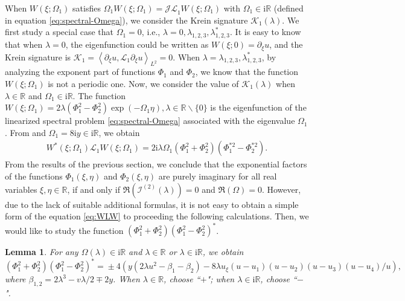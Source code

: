 \documentclass[11pt,reqno]{amsart}
\newcommand{\ii}{\mathrm{i}}
\newtheorem{lemma}{Lemma}
\numberwithin{equation}{section}
\begin{document}
When $W(\xi;\Omega_1)$ satisfies $\Omega_1W(\xi;\Omega_1)=\mathcal{JL}_1W(\xi;\Omega_1)$ with $\Omega_1\in \ii\mathbb{R}$ (defined in equation \eqref{eq:spectral-Omega}), we consider the Krein signature $\mathcal{K}_1(\lambda)$. 
We first study a special case that $\Omega_1=0$, i.e., $\lambda=0,\lambda_{1,2,3},\lambda_{1,2,3}^*$. 
It is easy to know that when $\lambda=0$, the eigenfunction could be written as $W(\xi;0)=\partial_{\xi}u$, and the Krein signature is $\mathcal{K}_1=\left\langle\partial_{\xi}u,\mathcal{L}_1 \partial_{\xi}u \right\rangle_{L^2}=0$. 
When $\lambda=\lambda_{1,2,3},\lambda_{1,2,3}^*$, by analyzing the exponent part of functions $\Phi_{1}$ and $\Phi_{2}$, we know that the function $W(\xi;\Omega_1)$ is not a periodic one. 
Now, we consider the value of $\mathcal{K}_1(\lambda)$ when $\lambda\in \mathbb{R}$ and $\Omega_1\in \ii \mathbb{R}$. 
The function $W(\xi;\Omega_1)=2\lambda(\Phi_{1}^2-\Phi_{2}^2)\exp(-\Omega_1 \eta),\lambda\in \mathbb{R}\backslash\{0\}$ is the eigenfunction of the linearized spectral problem \eqref{eq:spectral-Omega} associated with the eigenvalue $\Omega_1$. 
From \cite{LingS-23-mKdV-stability} and $\Omega_1=8\ii y\in \ii \mathbb{R}$, we obtain
\begin{equation}\label{eq:WLW}
	\begin{split}
		W^*(\xi;\Omega_1)\mathcal{L}_1 W(\xi;\Omega_1)
		=2\ii \lambda\Omega_1 (\Phi_{1}^2+\Phi_{2}^2)(\Phi_{1}^{*2}-\Phi_{2}^{*2}).
	\end{split}
\end{equation}	
From the results of the previous section, we conclude that the exponential factors of the functions $\Phi_{1}(\xi,\eta)$ and $\Phi_{2}(\xi,\eta)$ are purely imaginary for all real variables $\xi,\eta\in \mathbb{R}$,
if and only if $\Re( \mathcal{I}^{(2)} (\lambda))=0$ and $\Re(\Omega)=0$. 
However, due to the lack of suitable additional formulas, it is not easy to obtain a simple form of the equation \eqref{eq:WLW} to proceeding the following calculations.
Then, we would like to study the function $(\Phi_{1}^2+\Phi_{2}^2)(\Phi_{1}^2-\Phi_{2}^2)^*$. 

\begin{lemma}\label{lemma:Phi+-}
	For any $\Omega(\lambda)\in \ii \mathbb{R}$ and $\lambda \in \mathbb{R}$ or $\lambda \in \ii \mathbb{R}$, we obtain
	\begin{equation}\label{eq:phi-11-21}
			\!\! (\Phi_{1}^2+\Phi_{2}^2)(\Phi_{1}^2-\Phi_{2}^2)^* \!
			=\! \pm4(y(2\lambda u^2-\beta_1-\beta_2)-8\lambda u_{\xi}(u-u_1)(u-u_2)(u-u_3)(u-u_4)/u),
	\end{equation}
	where $\beta_{1,2}=2\lambda^3 - v\lambda/2 \mp 2y$. 
	When $\lambda \in  \mathbb{R}$, choose ``$+$";
	when $\lambda \in  \ii\mathbb{R}$, choose ``$-$".
\end{lemma}
\end{document}
